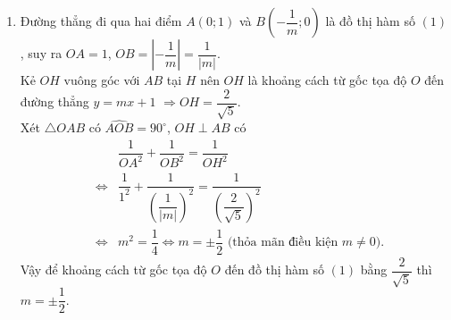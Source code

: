 \begin{bt}
{\begin{enumerate}
{\begin{eqnarray*}
{ -1}\\
&\Rightarrow& m=2 
\,\,\text{(thỏa mãn điều kiện $m\neq 0$)}.
\end{eqnarray*}
}
Vậy với $m=2$ thì đồ thị hàm số $(1)$ và đường thẳng $(d)$ song song.
 \item Đường thẳng đi qua hai điểm $A(0;1)$ và $B\left(-\dfrac{1}{m};0\right)$ là đồ thị hàm số $(1)$, suy ra $OA=1$, $OB=\left|-\dfrac{1}{m} \right|=\dfrac{1}{|m|}$.\\
 Kẻ $OH$ vuông góc với $AB$ tại $H$ nên $OH$ là khoảng cách từ gốc tọa độ $O$ đến đường thẳng $y=mx+1$ $\Rightarrow OH=\dfrac{2}{\sqrt{5}}$.\\
 Xét $\triangle OAB$ có $\widehat{AOB}=90^\circ$, $OH\perp AB$ có 
 {\allowdisplaybreaks
\begin{eqnarray*}
& & \dfrac{1}{OA^2}+\dfrac{1}{OB^2}=\dfrac{1}{OH^2}\\
&\Leftrightarrow& \dfrac{1}{1^2}+\dfrac{1}{\left(\dfrac{1}{|m|}\right)^2} =\dfrac{1}{\left(\dfrac{2}{\sqrt{5}}\right)^2}\\
&\Leftrightarrow& m^2=\dfrac{1}{4} \Leftrightarrow m = \pm \dfrac{1}{2}\,\,\text{(thỏa mãn điều kiện $m\neq 0$).}
\end{eqnarray*}
Vậy để khoảng cách từ gốc tọa độ $O$ đến đồ thị hàm số $(1)$ bằng $\dfrac{2}{\sqrt{5}}$ thì $m=\pm \dfrac{1}{2}$.
}
\end{enumerate}
}
\end{bt}
